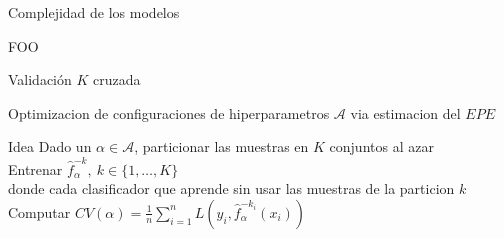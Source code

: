 \documentclass[xcolor=x11names]{beamer}
\begin{document}
\begin{frame}{Complejidad de los modelos}

	\centering

	\begin{block}{FOO}

	\end{block}

\end{frame}


\begin{frame}{Validación $K$ cruzada}

Optimizacion de configuraciones de hiperparametros $\mathcal{A}$ via estimacion del $EPE$

	\begin{block}{Idea}
		Dado un $\alpha \in \mathcal{A}$, particionar las muestras en $K$ conjuntos al azar
		\\
		Entrenar $\hat{f}_{\alpha}^{-k}, \ k \in \{1, \ldots, K\}$
		\\
		donde cada clasificador que aprende sin usar las muestras de la particion $k$
		\\
		Computar $CV(\alpha) = \frac{1}{n} \sum^n_{i=1} L\left( y_i, \hat{f}_{\alpha}^{-k_i}(x_i) \right)$
	\end{block}

\end{frame}
\end{document}
